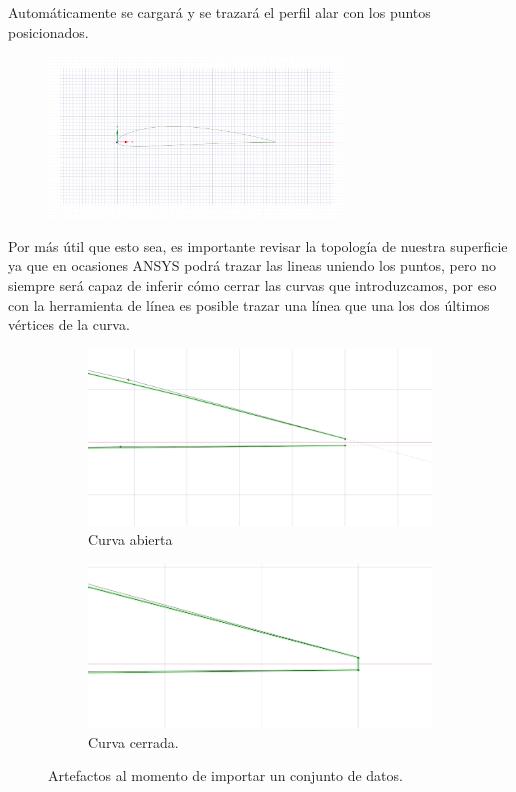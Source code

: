 \documentclass[12pt, letterpaper]{article}
\begin{document}
Automáticamente se cargará y se trazará el perfil alar con los puntos posicionados.

\begin{figure}[H]
	\centering
	\includegraphics[width=0.7\textwidth]{2.png}
	\caption{}
\end{figure}

Por más útil que esto sea, es importante revisar la topología de nuestra superficie ya que en ocasiones ANSYS podrá trazar las lineas uniendo los puntos, pero no siempre será capaz de inferir cómo cerrar las curvas que introduzcamos, por eso con la herramienta de línea es posible trazar una línea que una los dos últimos vértices de la curva.

\begin{figure}[H]
	\centering
	\begin{subfigure}[b]{0.49\linewidth}
		\includegraphics[width=\linewidth]{3.png}
		\caption{Curva abierta}
	\end{subfigure}
	\begin{subfigure}[b]{0.49\linewidth}
		\includegraphics[width=\linewidth]{4.png}
		\caption{Curva cerrada.}
	\end{subfigure}
	\caption{Artefactos al momento de importar un conjunto de datos.}
\end{figure}
\end{document}
